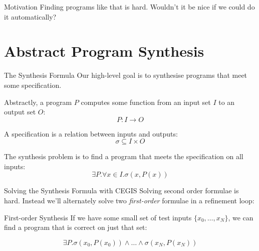 \documentclass[xcolor=pdftex,t,11pt]{beamer}
\begin{document}
\begin{frame}{Motivation}
 Finding programs like that is hard.  Wouldn't it be nice if we could do it automatically?
\end{frame}


\section{Abstract Program Synthesis}
\begin{frame}{The Synthesis Formula}
Our high-level goal is to synthesise programs that meet some specification.

\pause

Abstractly, a program $P$ computes some function from an input set $I$ to an output set $O$:
$$P : I \rightarrow O$$

\pause

A specification is a relation between inputs and outputs:
$$\sigma \subseteq I \times O$$

\pause

The synthesis problem is to find a program that meets the specification on all inputs:
$$\exists P . \forall x \in I . \sigma(x, P(x))$$
\end{frame}

\begin{frame}[fragile]{Solving the Synthesis Formula with CEGIS}
 Solving second order formulae is hard.  Instead we'll alternately solve two \emph{first-order} formulae
 in a refinement loop:

 \vspace{1cm}
 
\end{frame}

\begin{frame}{First-order Synthesis}
 If we have some small set of test inputs $\{ x_0, \dots, x_N\}$, we can find a program that is correct on just that set:

 $$\exists P . \sigma(x_0, P(x_0)) \wedge \dots \wedge \sigma(x_N, P(x_N))$$
\end{frame}
\end{document}
